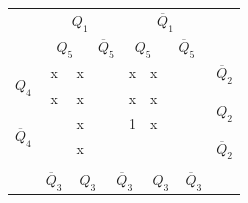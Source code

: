 \documentclass[a4paper,14pt]{article}
\begin{document}
\begin{table}[H]
	\begin{minipage}{.5\linewidth}
		\centering
\begin{tabular}{cccccccccc}
	& \multicolumn{4}{c}{$Q_1$}                                                                       & \multicolumn{4}{c}{$\overline{Q}_1$}                                                            &                        \\
	& \multicolumn{2}{c}{$Q_5$}                       & \multicolumn{2}{c}{$\overline{Q}_5$}          & \multicolumn{2}{c}{$Q_5$}                       & \multicolumn{2}{c}{$\overline{Q}_5$}          &                        \\ \cline{2-9}
	\multicolumn{1}{c|}{\multirow{2}{*}{$Q_4$}}            & \multicolumn{1}{c|}{x} & \multicolumn{1}{c|}{x} & \multicolumn{1}{c|}{} & \multicolumn{1}{c|}{} & \multicolumn{1}{c|}{x} & \multicolumn{1}{c|}{x} & \multicolumn{1}{c|}{} & \multicolumn{1}{c|}{} & $\overline{Q}_2$       \\ \cline{2-9}
	\multicolumn{1}{c|}{}                                  & \multicolumn{1}{c|}{x} & \multicolumn{1}{c|}{x} & \multicolumn{1}{c|}{} & \multicolumn{1}{c|}{} & \multicolumn{1}{c|}{x} & \multicolumn{1}{c|}{x} & \multicolumn{1}{c|}{} & \multicolumn{1}{c|}{} & \multirow{2}{*}{$Q_2$} \\ \cline{2-9}
	\multicolumn{1}{c|}{\multirow{2}{*}{$\overline{Q}_4$}} & \multicolumn{1}{c|}{}  & \multicolumn{1}{c|}{x} & \multicolumn{1}{c|}{} & \multicolumn{1}{c|}{} & \multicolumn{1}{c|}{1} & \multicolumn{1}{c|}{x} & \multicolumn{1}{c|}{} & \multicolumn{1}{c|}{} &                        \\ \cline{2-9}
	\multicolumn{1}{c|}{}                                  & \multicolumn{1}{c|}{}  & \multicolumn{1}{c|}{x} & \multicolumn{1}{c|}{} & \multicolumn{1}{c|}{} & \multicolumn{1}{c|}{}  & \multicolumn{1}{c|}{}  & \multicolumn{1}{c|}{} & \multicolumn{1}{c|}{} & $\overline{Q}_2$       \\ \cline{2-9}
	&                        & \multicolumn{2}{c}{}                           & \multicolumn{2}{c}{}                           & \multicolumn{2}{c}{}                           &                       &                        \\
	& $\overline{Q}_3$       & \multicolumn{2}{c}{$Q_3$}                      & \multicolumn{2}{c}{$\overline{Q}_3$}           & \multicolumn{2}{c}{$Q_3$}                      & $\overline{Q}_3$      &                       

\end{tabular}
\end{minipage}
\end{table}
\end{document}
